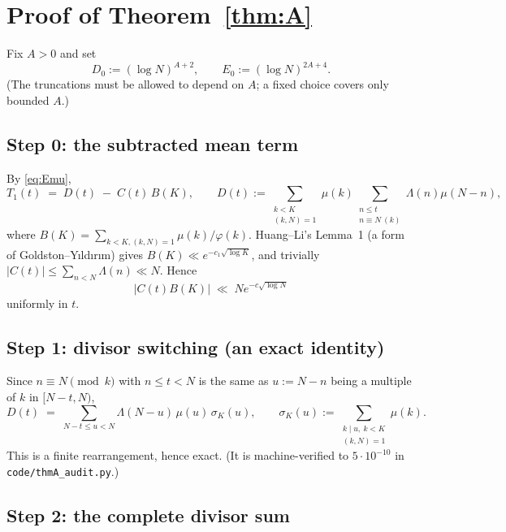 \documentclass[11pt,a4paper]{article}
\theoremstyle{plain}
\theoremstyle{definition}
\begin{document}
\section{Proof of Theorem~\ref{thm:A}}\label{sec:proof}

Fix $A>0$ and set
\begin{equation}\label{eq:trunc}
  D_0 := (\log N)^{A+2}, \qquad E_0 := (\log N)^{2A+4} .
\end{equation}
(The truncations must be allowed to depend on $A$; a fixed choice covers
only bounded $A$.)

\subsection{Step 0: the subtracted mean term}

By \eqref{eq:Emu},
\begin{equation}\label{eq:split0}
  T_1(t) \;=\; D(t) \;-\; C(t)\,B(K),
  \qquad
  D(t):=\sum_{\substack{k<K\\(k,N)=1}}\mu(k)
        \sum_{\substack{n\le t\\ n\equiv N\ (k)}}\Lambda(n)\mu(N-n),
\end{equation}
where $B(K)=\sum_{k<K,(k,N)=1}\mu(k)/\varphi(k)$. Huang--Li's Lemma~1
(a form of Goldston--Y{\i}ld{\i}r{\i}m) gives
$B(K)\ll e^{-c_1\sqrt{\log K}}$, and trivially
$|C(t)|\le\sum_{n<N}\Lambda(n)\ll N$. Hence
\begin{equation}\label{eq:meanterm}
  |C(t)B(K)| \;\ll\; N e^{-c\sqrt{\log N}}
\end{equation}
uniformly in $t$.

\subsection{Step 1: divisor switching (an exact identity)}

Since $n\equiv N\pmod k$ with $n\le t<N$ is the same as $u:=N-n$ being a
multiple of $k$ in $[N-t,N)$,
\begin{equation}\label{eq:switch}
  D(t) \;=\; \sum_{N-t\le u<N}\Lambda(N-u)\,\mu(u)\,\sigma_K(u),
  \qquad
  \sigma_K(u):=\sum_{\substack{k\mid u,\ k<K\\ (k,N)=1}}\mu(k) .
\end{equation}
This is a finite rearrangement, hence exact. (It is machine-verified to
$5\cdot10^{-10}$ in \texttt{code/thmA\_audit.py}.)

\subsection{Step 2: the complete divisor sum}
\end{document}
